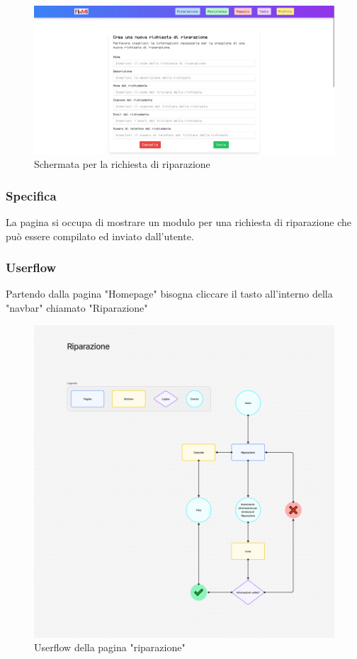 \documentclass{report}
\begin{document}
\begin{figure}[H]
	\centering\includegraphics[width=1\textwidth]{images/microservizio-home/frontend/riparazione.jpg}
	\caption{Schermata per la richiesta di riparazione}
\end{figure}
\subsubsection*{Specifica}
La pagina si occupa di mostrare un modulo per una richiesta di riparazione che può essere compilato ed inviato dall'utente.\\ 

\subsubsection*{Userflow}
Partendo dalla pagina "Homepage" bisogna cliccare il tasto all'interno della "navbar" chiamato "Riparazione"
\begin{figure}[H]
	\centering\includegraphics[width=1\textwidth]{images/microservizio-home/frontend/riparazione-userflow.png}
	Userflow della pagina "riparazione"
\end{figure}
\end{document}
